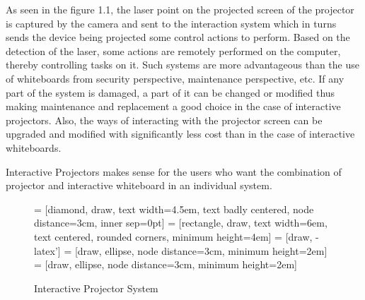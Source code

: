 \documentclass[12pt, a4paper]{article}
\begin{document}
As seen in the figure 1.1, the laser point on the projected screen of the projector is captured by the camera and sent to the interaction system which in turns sends the device being projected some control actions to perform. Based on the detection of the laser, some actions are remotely performed on the computer, thereby controlling tasks on it. Such systems are more advantageous than
the use of whiteboards from security perspective, maintenance perspective,
etc. If any part of the system is damaged, a part of it can be changed
or modified thus making maintenance and replacement a good choice in the
case of interactive projectors. Also, the ways of interacting with the projector
screen can be upgraded and modified with significantly less cost than in the
case of interactive whiteboards. 

Interactive Projectors makes sense for the
users who want the combination of projector and interactive whiteboard in
an individual system. 

\begin{figure} 
\centering
{} = [diamond, draw, text width=4.5em, text badly centered, node distance=3cm, inner sep=0pt]
 = [rectangle, draw, text width=6em, text centered, rounded corners, minimum height=4em]
 = [draw, -latex']
 = [draw, ellipse, node distance=3cm,
    minimum height=2em]
 = [draw, ellipse, node distance=3cm,
    minimum height=2em]
    
\caption{Interactive Projector System}\label{}
\end{figure}
\newpage
\end{document}
